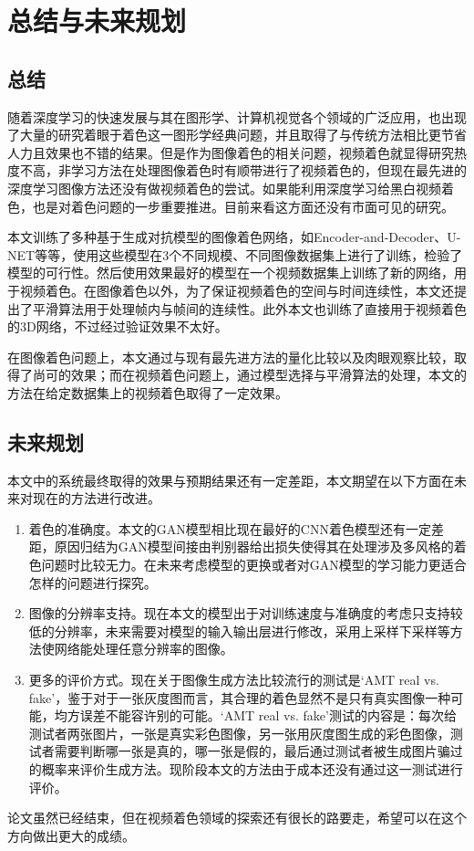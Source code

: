 \chapter{总结与未来规划}
\label{cha:7-conclusion}

\section{总结}
\label{sec:conclusion}

  随着深度学习的快速发展与其在图形学、计算机视觉各个领域的广泛应用，也出现了大量的研究着眼于着色这一图形学经典问题，并且取得了与传统方法相比更节省人力且效果也不错的结果。但是作为图像着色的相关问题，视频着色就显得研究热度不高，非学习方法在处理图像着色时有顺带进行了视频着色的，但现在最先进的深度学习图像方法还没有做视频着色的尝试。如果能利用深度学习给黑白视频着色，也是对着色问题的一步重要推进。目前来看这方面还没有市面可见的研究。

  本文训练了多种基于生成对抗模型的图像着色网络，如Encoder-and-Decoder、U-NET等等，使用这些模型在3个不同规模、不同图像数据集上进行了训练，检验了模型的可行性。然后使用效果最好的模型在一个视频数据集上训练了新的网络，用于视频着色。在图像着色以外，为了保证视频着色的空间与时间连续性，本文还提出了平滑算法用于处理帧内与帧间的连续性。此外本文也训练了直接用于视频着色的3D网络，不过经过验证效果不太好。

  在图像着色问题上，本文通过与现有最先进方法的量化比较以及肉眼观察比较，取得了尚可的效果；而在视频着色问题上，通过模型选择与平滑算法的处理，本文的方法在给定数据集上的视频着色取得了一定效果。

\section{未来规划}
\label{sec:future-works}

  本文中的系统最终取得的效果与预期结果还有一定差距，本文期望在以下方面在未来对现在的方法进行改进。

  \begin{enumerate}
    \item 着色的准确度。本文的GAN模型相比现在最好的CNN着色模型还有一定差距，原因归结为GAN模型间接由判别器给出损失使得其在处理涉及多风格的着色问题时比较无力。在未来考虑模型的更换或者对GAN模型的学习能力更适合怎样的问题进行探究。
    \item 图像的分辨率支持。现在本文的模型出于对训练速度与准确度的考虑只支持较低的分辨率，未来需要对模型的输入输出层进行修改，采用上采样下采样等方法使网络能处理任意分辨率的图像。
    \item 更多的评价方式。现在关于图像生成方法比较流行的测试是‘AMT real vs. fake’，鉴于对于一张灰度图而言，其合理的着色显然不是只有真实图像一种可能，均方误差不能容许别的可能。‘AMT real vs. fake’测试的内容是：每次给测试者两张图片，一张是真实彩色图像，另一张用灰度图生成的彩色图像，测试者需要判断哪一张是真的，哪一张是假的，最后通过测试者被生成图片骗过的概率来评价生成方法。现阶段本文的方法由于成本还没有通过这一测试进行评价。
  \end{enumerate}

  论文虽然已经结束，但在视频着色领域的探索还有很长的路要走，希望可以在这个方向做出更大的成绩。